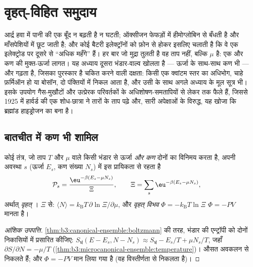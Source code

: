 \chapter{वृहत्-विहित समुदाय}\label{ch:b3:grand-canonical}

आर्द्र हवा में पानी की एक बूँद न बढ़ती है न घटती; ऑक्सीजन फेफड़ों में
हीमोग्लोबिन से बँधती है और माँसपेशियों में छूट जाती है; और कोई बैटरी
इलेक्ट्रॉनों को फ़ोन से होकर इसलिए चलाती है कि वे एक इलेक्ट्रोड पर
दूसरे से ``अधिक महँगे'' हैं। हर बार जो मुद्रा तुलती है वह ताप नहीं,
बल्कि \emph{} $\mu$ है: एक और कण की मुक्त-ऊर्जा लागत। यह
अध्याय दूसरा भंडार-वाल्व खोलता है --- ऊर्जा के साथ-साथ कण भी ---
और  गढ़ता है, जिसका पुरस्कार है
चकित करने वाली दक्षता: किसी एक क्वांटम स्तर का अधिभोग, चाहे
फ़र्मिऑन हो या बोसॉन, दो पंक्तियों में निकल आता है, और उसी के साथ
अगले अध्याय के मूल सूत्र भी। इसके उपयोग गैस-मुखौटों और उत्प्रेरक
परिवर्तकों के अधिशोषण-समतापियों से लेकर
 तक फैले हैं, जिससे 1925 में हार्वर्ड की एक शोध-छात्रा ने
तारों के ताप पढ़े और, सारी अपेक्षाओं के विरुद्ध, यह खोजा कि
ब्रह्मांड हाइड्रोजन का बना है।

\section{बातचीत में कण भी शामिल}

\begin{theorem}[वृहत्-विहित वितरण]\label{thm:b3:grand-canonical:distribution}
कोई तंत्र, जो ताप $T$ और  $\mu$ वाले किसी भंडार से ऊर्जा
\emph{और कण} दोनों का विनिमय करता है, अपनी अवस्था $s$
(ऊर्जा $E_s$, कण संख्या $N_s$) में इस प्रायिकता से रहता है
\[
\mathcal P_s = \frac{\eu^{-\beta(E_s - \mu N_s)}}{\Xi} , \qquad
\Xi = \sum_s\eu^{-\beta(E_s - \mu N_s)} ,
\]
अर्थात् \emph{वृहत् }। $\Xi$ से: $\langle N\rangle
= k_{\text{B}}T\,\partial\ln\Xi/\partial\mu$, और \emph{वृहत्
विभव} $\Phi = -k_{\text{B}}T\ln\Xi$ $\Phi = -PV$ मानता है।
\end{theorem}

\begin{proof}[आंशिक उपपत्ति]
\cref{thm:b3:canonical-ensemble:boltzmann} की तरह, भंडार की
एन्ट्रॉपी को दोनों निकासियों में प्रसारित कीजिए:
$S_{\text{भं}}(E - E_s, N - N_s) \approx S_{\text{भं}} - E_s/T +
\mu N_s/T$, जहाँ $\partial S/\partial N = -\mu/T$
(\cref{thm:b3:microcanonical-ensemble:temperature})। औसत
अवकलन से निकलते हैं; और $\Phi = -PV$ मान लिया गया है (वह
विस्तीर्णता से निकलता है)।
\end{proof}

